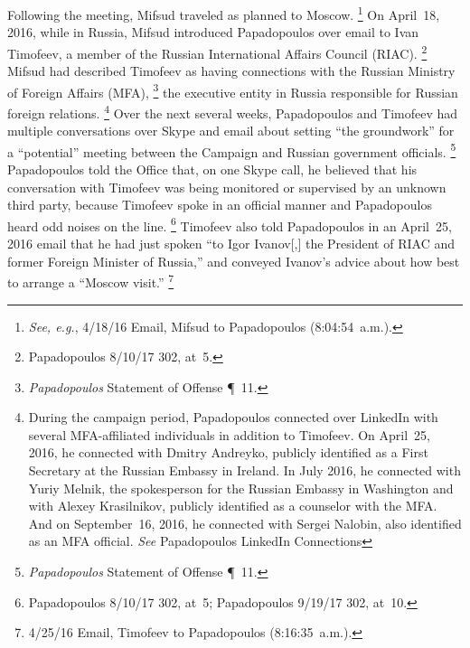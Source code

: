 Following the meeting, Mifsud traveled as planned to Moscow.%
\footnote{\textit{See, e.g.}, 4/18/16 Email, Mifsud to Papadopoulos (8:04:54~a.m.).}
On April~18, 2016, while in Russia, Mifsud introduced Papadopoulos over email to Ivan Timofeev, a member of the Russian International Affairs Council (RIAC).%
\footnote{Papadopoulos 8/10/17 302, at~5.}
Mifsud had described Timofeev as having connections with the Russian Ministry of Foreign Affairs (MFA),%
\footnote{\textit{Papadopoulos} Statement of Offense \P~11.}
the executive entity in Russia responsible for Russian foreign relations.%
\footnote{During the campaign period, Papadopoulos connected over LinkedIn with several MFA-affiliated individuals in addition to Timofeev.
On April~25, 2016, he connected with Dmitry Andreyko, publicly identified as a First Secretary at the Russian Embassy in Ireland.
In July 2016, he connected with Yuriy Melnik, the spokesperson for the Russian Embassy in Washington and with Alexey Krasilnikov, publicly identified as a counselor with the MFA\null.
And on September~16, 2016, he connected with Sergei Nalobin, also identified as an MFA official.
\textit{See} Papadopoulos LinkedIn Connections }
Over the next several weeks, Papadopoulos and Timofeev had multiple conversations over Skype and email about setting ``the groundwork'' for a ``potential'' meeting between the Campaign and Russian government officials.%
\footnote{\textit{Papadopoulos} Statement of Offense \P~11.}
Papadopoulos told the Office that, on one Skype call, he believed that his conversation with Timofeev was being monitored or supervised by an unknown third party, because Timofeev spoke in an official manner and Papadopoulos heard odd noises on the line.%
\footnote{Papadopoulos 8/10/17 302, at~5; Papadopoulos 9/19/17 302, at~10.}
Timofeev also told Papadopoulos in an April~25, 2016 email that he had just spoken ``to Igor Ivanov[,] the President of RIAC and former Foreign Minister of Russia,'' and conveyed Ivanov's advice about how best to arrange a ``Moscow visit.''%
\footnote{4/25/16 Email, Timofeev to Papadopoulos (8:16:35~a.m.).}


